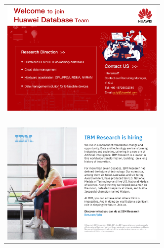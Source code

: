 \begin{tabular}{C{\linewidth}}
\includegraphics[width=80mm]{ads/huawei.jpg} \\ ~ \\
\includegraphics[width=80mm]{ads/ibm.pdf}
\end{tabular}

